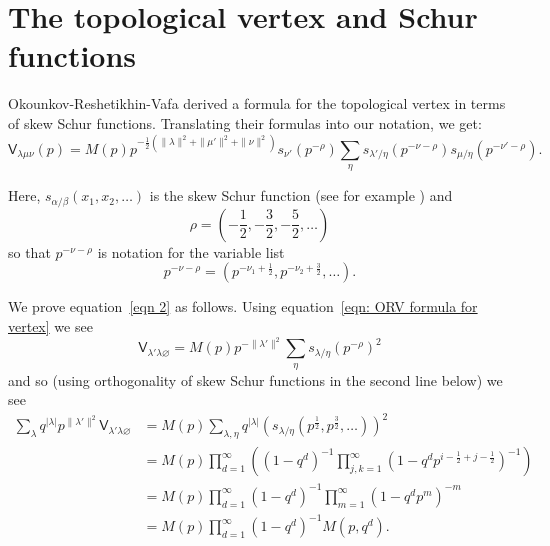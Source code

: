 \documentclass[12pt]{amsart}
\newcommand{\Vsf}{\mathsf{V}}
\renewcommand{\emptyset}{\varnothing}
\newcommand{\half}{\frac{1}{2}}
\theoremstyle{definition}
\newcommand{\ptotheminusrho}{p^{-\rho}}
\begin{document}
\section{The topological vertex and Schur functions}\label{sec: topo
vertex and schur fncs}

Okounkov-Reshetikhin-Vafa derived a formula for the topological vertex
in terms of skew Schur functions. Translating their formulas
\cite[3.20\& 3.21]{Ok-Re-Va} into our notation, we get:
\begin{equation}\label{eqn: ORV formula for vertex}
\Vsf_{\lambda \mu \nu}(p) = M(p) p^{-\half (\| \lambda \| ^{2}+\| \mu'
\| ^{2}+\| \nu \| ^{2})} s_{\nu '}(\ptotheminusrho ) \sum_{\eta} s_{\lambda
'/\eta}(p^{-\nu -\rho})s_{\mu /\eta}(p^{-\nu '-\rho} ).
\end{equation}

Here, $s_{\alpha /\beta}(x_{1},x_{2},\dots )$ is the skew Schur
function (see for example \cite[\S~5]{MacDonald}) and 
\[
\rho =\left(-\half ,-\frac{3}{2},-\frac{5}{2},\dots  \right)
\]
so that $p^{-\nu -\rho}$ is notation for the variable list
\[
p^{-\nu -\rho} = \left(p^{-\nu_{1} +\half },p^{-\nu_{2} +\frac{3}{2}},\dots   \right).
\]

We prove equation~\eqref{eqn 2} as follows. 
Using equation~\eqref{eqn: ORV formula for vertex} we see 
\[
\Vsf_{\lambda '\lambda \emptyset} = M(p)p^{-\| \lambda' \| ^{2}}
\sum_{\eta} s_{\lambda /\eta}(\ptotheminusrho )^{2}
\]
and so (using orthogonality of skew Schur functions \cite[28(a) pg
94]{MacDonald} in the second line below) we see
\begin{align*}
\sum_{\lambda} q^{|\lambda |} p^{\| \lambda' \| ^{2}} \Vsf_{\lambda
'\lambda \emptyset} &= M(p)\sum_{\lambda ,\eta} q^{|\lambda |} (s_{\lambda /\eta}(p^{\half },p^{\frac{3}{2}},\dots ))^{2}\\
&=M(p)\prod_{d=1}^{\infty} \left((1-q^{d})^{-1}\prod_{j,k=1}^{\infty}(1-q^{d}p^{i-\half +j-\half })^{-1} \right)\\
&= M(p) \prod_{d=1}^{\infty} (1-q^{d})^{-1}\prod_{m=1}^{\infty}(1-q^{d}p^{m})^{-m}\\
&=M(p)\prod_{d=1}^{\infty} (1-q^{d})^{-1}M(p,q^{d}).
\end{align*}
\end{document}
